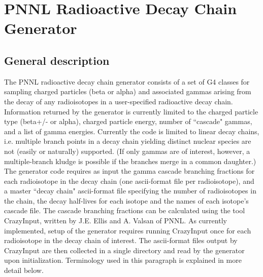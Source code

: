   


\section{PNNL Radioactive Decay Chain Generator}

\subsection{General description}

 The PNNL radioactive decay chain generator consists of a set of G4 classes for
sampling charged particles (beta or alpha) and associated gammas arising from 
the decay of any radioisotopes in a user-{}specified radioactive decay chain.
Information returned by the generator is currently limited to the charged
particle type (beta+/-{} or alpha), charged particle energy, number of ``cascade"
gammas, and a list of gamma energies.  Currently the code is limited to linear
decay chains, i.e. multiple branch points in a decay chain yielding distinct
nuclear species are not (easily or naturally) supported.  (If only gammas are
of interest, however, a multiple-{}branch kludge is possible if the branches
merge in a common daughter.)  The generator code requires as input the gamma 
cascade branching fractions for each radioisotope in the decay chain (one
ascii-{}format file per radioisotope), and a master ``decay chain" ascii-{}format
file specifying the number of radioisotopes in the chain, the decay half-{}lives
for each isotope and the names of each isotope's cascade file.  The cascade
branching fractions can be calculated using the tool CrazyInput, written by 
J.E. Ellis and A. Valsan of PNNL.  As currently implemented, setup of the 
generator requires running CrazyInput once for each radioisotope in the decay 
chain of interest.  The ascii-{}format files output by CrazyInput are then
collected in a single directory and read by the generator upon initialization.
Terminology used in this paragraph is explained in more detail below.
 

